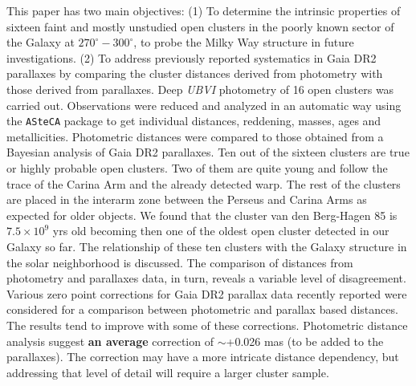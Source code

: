 \documentclass[draft]{aa}
\begin{document}
\abstract
{}
{This paper has two main objectives:
(1) To determine the intrinsic properties of sixteen faint and mostly
unstudied open clusters in the poorly known sector
of the Galaxy at $270^\circ-300^\circ$, to probe the Milky Way
structure in future investigations.
(2) To address previously reported systematics in Gaia DR2 parallaxes by
comparing the cluster distances derived from photometry with
those derived from parallaxes.
}
%
{Deep \textit{UBVI} photometry of 16 open clusters was carried out.
Observations were reduced and analyzed in an automatic way using the 
\texttt{ASteCA} package to get individual distances, reddening,
masses, ages and metallicities. Photometric distances were compared to
those obtained from a Bayesian analysis of Gaia DR2 parallaxes.
}
%
{Ten out of the sixteen clusters are true or highly probable open
clusters. Two of them are quite young and follow the trace of the Carina Arm
and the already detected warp.
The rest of the clusters are placed in the interarm zone between the
Perseus and Carina Arms as expected for older objects.
We found that the cluster van den Berg-Hagen 85 is $7.5\times10^9$ yrs
old becoming then one of the oldest open cluster detected in our Galaxy so
far.
%
The relationship of these ten clusters with the Galaxy structure in
the solar neighborhood is discussed.
The comparison of distances from photometry and parallaxes data, in turn,
reveals a variable level of disagreement.
}
%
{
Various zero point corrections for Gaia DR2 parallax data recently
reported were considered for a comparison between photometric and
parallax based distances.
The results tend to improve with some of these corrections. 
Photometric distance analysis suggest \textbf{an average} correction of
$\sim$+0.026 mas (to be added to the parallaxes).
%
The correction may have a more intricate distance dependency, but addressing
that level of detail will require a larger cluster sample.
}


\maketitle
\end{document}
